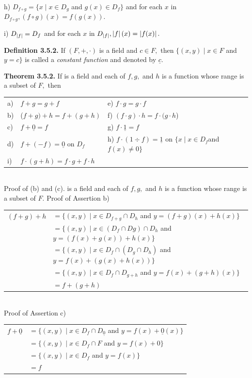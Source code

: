 \begin{large}
\newpage

h) $D_{f\circ g } = \{x \mid x\in  D_{g}$ and $g(x) \in D_{f}\}$ and for each $x$ in $D_{f\circ g} ,(f\circ g) (x) = f(g(x)).$ \nl

i) $D_{\left|f\right|} = D_{f}$ and for each $x$ in $D_{\left|f\right|} , \left|f\right|(x)=\left|f(x)\right| .$\nl

\textbf{Definition 3.5.2.} If $(F,+,\cdot)$ is a field and $c\in F,$ then $\{(x,y) \mid x\in F $ and $y = c\}$ is called a \textit{constant function} and denoted by $\underline{c}.$\nl

\textbf{Theorem 3.5.2.} If \fld is a field and each of $f, g,$ and $h$ is a function whose range is a subset of $F,$ then\nl
\begin{tabular}{l l l}
a) & $f+g=g+f$ & e) $f\cdot g=g\cdot f$ \\
b) &($f+g)+h=f+(g+h)$ &f) $(f\cdot g)\cdot h= f\cdot (g\cdot h$) \\
c) &$f + \underline{0} =f$ &g) $f\cdot \underline{1}  = f$ \\
d) &$f+(-f) = \underline{0}$ on $D_{f}$& h) $f\cdot (1\div f) =\underline{1}$ on $\{x \mid x\in D_{f}$and $f(x)\neq 0\}$ \\
i) &$f\cdot (g+h)=f\cdot g + f\cdot h$&\\
\end{tabular}\\


Proof of (b) and (c). \fld is a field and each of $f, g,$ and $h$ is a function whose range is a subset of $F.$\nl
    Proof of Assertion b)\nl
\begin{tabular}{l l }
$(f+g)+h$ &$= \{(x,y) \mid  x\in D_{f+g}\cap D_{h}$ and $y =(f+g)(x)+h(x) \}$\\
&$=\{(x,y) \mid x\in (D_{f}\cap Dg)\cap D_{h}$ and $y=(f(x)+g(x))+h(x)\}$\\
&$= \{(x,y) \mid x\in D_{f}\cap (D_{g}\cap D_{h})$ and $y = f(x)+(g(x)+h(x))\} $\\
&$=\{(x,y) \mid x\in D_{f}\cap D_{g+h}$ and $y=f(x)+(g+h)(x) \}$\\
&$=f+(g+h)$ \\
\end{tabular}\\
Proof of Assertion c) \nl
\begin{tabular}{l l }
$f + \underline{0}$ & $= \{(x,y) \mid x\in D_{f}\cap D_{\underline{0}}$ and $y=f(x) + \underline{0}(x) \} $\\
&$= \{(x,y) \mid x\in D_{f}\cap F$ and $y= f(x) + 0\} $\\
&$= \{(x,y) \mid x\in D_{f}$ and $y=f(x) \} $\\
&$=f$ \\
\end{tabular}\nl


\end{large}
